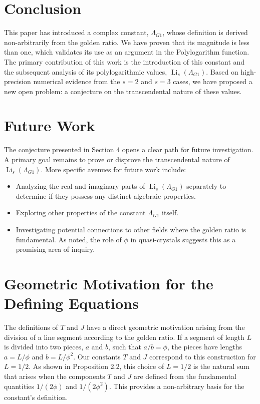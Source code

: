 \documentclass{amsart}
\theoremstyle{plain}
\theoremstyle{definition}
\theoremstyle{remark}
\DeclareMathOperator{\Li}{Li} %
\newcommand{\LambdaG}{\Lambda_{G1}}
\begin{document}
\section{Conclusion}
This paper has introduced a complex constant, $\LambdaG$, whose definition is derived non-arbitrarily from the golden ratio. We have proven that its magnitude is less than one, which validates its use as an argument in the Polylogarithm function. The primary contribution of this work is the introduction of this constant and the subsequent analysis of its polylogarithmic values, $\Li_s(\LambdaG)$. Based on high-precision numerical evidence from the $s=2$ and $s=3$ cases, we have proposed a new open problem: a conjecture on the transcendental nature of these values.

\section{Future Work}
The conjecture presented in Section 4 opens a clear path for future investigation. A primary goal remains to prove or disprove the transcendental nature of $\Li_s(\LambdaG)$. More specific avenues for future work include:
\begin{itemize}
    \item Analyzing the real and imaginary parts of $\Li_s(\LambdaG)$ separately to determine if they possess any distinct algebraic properties.
    \item Exploring other properties of the constant $\LambdaG$ itself.
    \item Investigating potential connections to other fields where the golden ratio is fundamental. As noted, the role of $\phi$ in quasi-crystals suggests this as a promising area of inquiry.
\end{itemize}

\appendix
\section{Geometric Motivation for the Defining Equations}
The definitions of $T$ and $J$ have a direct geometric motivation arising from the division of a line segment according to the golden ratio. If a segment of length $L$ is divided into two pieces, $a$ and $b$, such that $a/b = \phi$, the pieces have lengths $a=L/\phi$ and $b=L/\phi^2$. Our constants $T$ and $J$ correspond to this construction for $L=1/2$. As shown in Proposition 2.2, this choice of $L=1/2$ is the natural sum that arises when the components $T$ and $J$ are defined from the fundamental quantities $1/(2\phi)$ and $1/(2\phi^2)$. This provides a non-arbitrary basis for the constant's definition.
\end{document}
